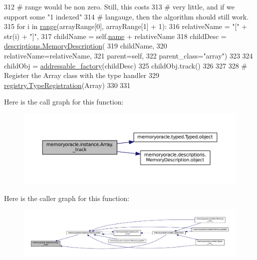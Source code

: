 \begin{DoxyCode}
312         \textcolor{comment}{# range would be non zero.  Still, this costs}
313         \textcolor{comment}{# very little, and if we support some "1 indexed"}
314         \textcolor{comment}{# langauge, then the algorithm should still work.}
315         \textcolor{keywordflow}{for} i \textcolor{keywordflow}{in} \hyperlink{classmemoryoracle_1_1instance_1_1Array_acb456ee173f41d41e16e1bebfba48aa6}{range}(arrayRange[0], arrayRange[1] + 1):
316             relativeName = \textcolor{stringliteral}{"["} + str(i) + \textcolor{stringliteral}{"]"},
317             childName = self.\hyperlink{classmemoryoracle_1_1instance_1_1Memory_a00f51174e05bcbaa2d0ec3faccbaffaa}{name} + relativeName
318             childDesc = \hyperlink{classmemoryoracle_1_1descriptions_1_1MemoryDescription}{descriptions.MemoryDescription}(
319                 childName,
320                 relativeName=relativeName,
321                 parent=self,
322                 parent\_class=\textcolor{stringliteral}{"array"})
323 
324             childObj = \hyperlink{namespacememoryoracle_1_1instance_ac651a8635b1ae2ee7e788bf9adb17a0b}{addressable\_factory}(childDesc)
325             childObj.track()
326 
327 
328 \textcolor{comment}{# Register the Array class with the type handler}
329 \hyperlink{classmemoryoracle_1_1registry_1_1TypeRegistration}{registry.TypeRegistration}(Array)
330 
331 
\end{DoxyCode}


Here is the call graph for this function\+:
\nopagebreak
\begin{figure}[H]
\begin{center}
\leavevmode
\includegraphics[width=350pt]{classmemoryoracle_1_1instance_1_1Array_a1d8c3993d8a52bfbec8240d6f79b3ce1_cgraph}
\end{center}
\end{figure}




Here is the caller graph for this function\+:
\nopagebreak
\begin{figure}[H]
\begin{center}
\leavevmode
\includegraphics[width=350pt]{classmemoryoracle_1_1instance_1_1Array_a1d8c3993d8a52bfbec8240d6f79b3ce1_icgraph}
\end{center}
\end{figure}




